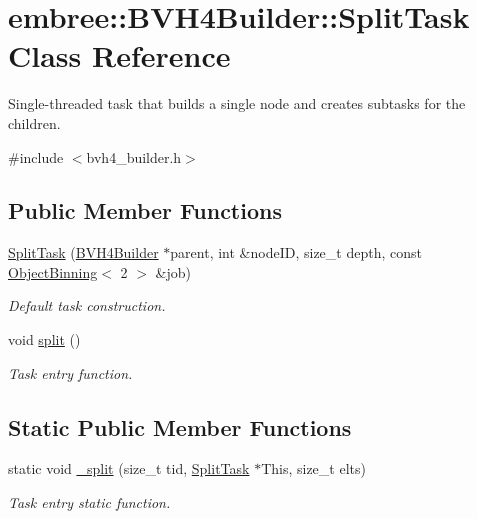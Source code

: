 \hypertarget{classembree_1_1_b_v_h4_builder_1_1_split_task}{
\section{embree::BVH4Builder::SplitTask Class Reference}
\label{classembree_1_1_b_v_h4_builder_1_1_split_task}
}


Single-\/threaded task that builds a single node and creates subtasks for the children.  




{\ttfamily \#include $<$bvh4\_\-builder.h$>$}

\subsection*{Public Member Functions}
\begin{DoxyCompactItemize}
\item 
\hyperlink{classembree_1_1_b_v_h4_builder_1_1_split_task_a4b0948fdc8b1fd3efe7887ac78477e02}{SplitTask} (\hyperlink{classembree_1_1_b_v_h4_builder}{BVH4Builder} $\ast$parent, int \&nodeID, size\_\-t depth, const \hyperlink{classembree_1_1_object_binning}{ObjectBinning}$<$ 2 $>$ \&job)
\begin{DoxyCompactList}\small\item\em Default task construction. \item\end{DoxyCompactList}\item 
void \hyperlink{classembree_1_1_b_v_h4_builder_1_1_split_task_a9a8ea8c801f1962efeff713b350fdba7}{split} ()
\begin{DoxyCompactList}\small\item\em Task entry function. \item\end{DoxyCompactList}\end{DoxyCompactItemize}
\subsection*{Static Public Member Functions}
\begin{DoxyCompactItemize}
\item 
static void \hyperlink{classembree_1_1_b_v_h4_builder_1_1_split_task_a0c93d4f38713f876fa5592ff8631c829}{\_\-split} (size\_\-t tid, \hyperlink{classembree_1_1_b_v_h4_builder_1_1_split_task}{SplitTask} $\ast$This, size\_\-t elts)
\begin{DoxyCompactList}\small\item\em Task entry static function. \item\end{DoxyCompactList}\end{DoxyCompactItemize}


